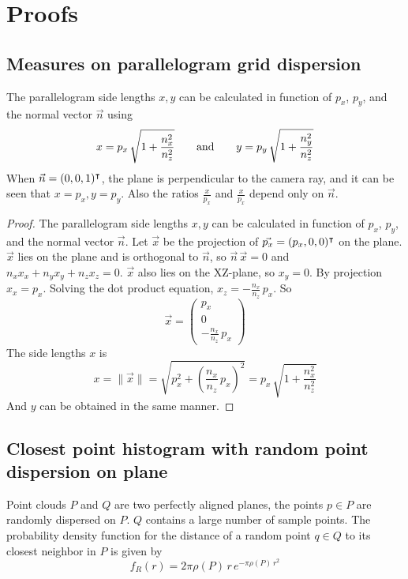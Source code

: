 \chapter{Proofs}

\section{Measures on parallelogram grid dispersion} \label{sec:proof_pargrid_measures}

The parallelogram side lengths $x, y$ can be calculated in function of $p_x$, $p_y$, and the normal vector $\vec{n}$ using
\begin{equation}
x = p_x \, \sqrt{1 + \frac{n^2_x}{n^2_z}}
\hspace{7mm} \text{and} \hspace{7mm}
y = p_y \, \sqrt{1 + \frac{n^2_y}{n^2_z}}
\end{equation}
When $\vec{n} = (0, 0, 1)^\intercal$, the plane is perpendicular to the camera ray, and it can be seen that $x = p_x, y = p_y$. Also the ratios $\frac{x}{p_x}$ and $\frac{x}{p_x}$ depend only on $\vec{n}$.

\begin{proof}
The parallelogram side lengths $x, y$ can be calculated in function of $p_x$, $p_y$, and the normal vector $\vec{n}$. Let $\vec{x}$ be the projection of $\vec{p_x} = (p_x, 0, 0)^\intercal$ on the plane. $\vec{x}$ lies on the plane and is orthogonal to $\vec{n}$, so $\vec{n} \, \vec{x} = 0$ and $n_x x_x + n_y x_y + n_z x_z = 0$. $\vec{x}$ also lies on the XZ-plane, so $x_y = 0$. By projection $x_x = p_x$. Solving the dot product equation, $x_z = -\frac{n_x}{n_z} \, p_x$. So
\begin{equation}
\vec{x} = \left( \begin{matrix}
	p_x \\
	0 \\
	-\frac{n_x}{n_z} \, p_x
\end{matrix} \right)
\end{equation}
The side lengths $x$ is
\begin{equation}
x = \| \vec{x} \| = \sqrt{p^2_x + \left( \frac{n_x}{n_z} \, p_x \right)^2} = p_x \, \sqrt{1 + \frac{n^2_x}{n^2_z}}
\end{equation}
And $y$ can be obtained in the same manner.
\end{proof}




\section{Closest point histogram with random point dispersion on plane} \label{sec:proof_rand_disp_plane}
Point clouds $P$ and $Q$ are two perfectly aligned planes, the points $p \in P$ are randomly dispersed on $P$. $Q$ contains a large number of sample points. The probability density function for the distance of a random point $q \in Q$ to its closest neighbor in $P$ is given by
\begin{equation}
f_R(r) = 2 \pi \rho(P) \, r \, e^{-\pi \rho(P) \, r^2}
\end{equation}

